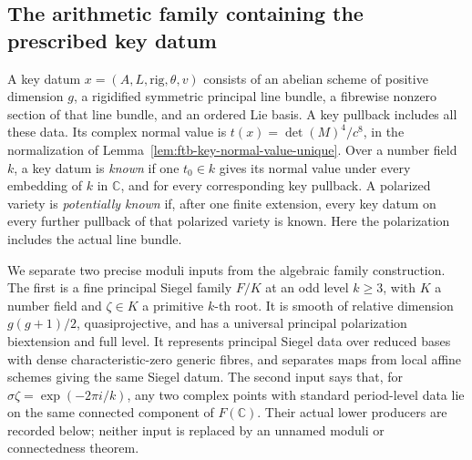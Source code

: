 \subsection{The arithmetic family containing the prescribed key datum}
\label{subsec:ftb-arithmetic-key-family}

A key datum \(x=(A,L,\mathrm{rig},\theta,v)\) consists of an abelian
scheme of positive dimension \(g\), a rigidified symmetric principal
line bundle, a fibrewise nonzero section of that line bundle, and
an ordered Lie basis.  A key pullback includes all these data.
Its complex normal value is \(t(x)=\det(M)^4/c^8\), in the
normalization of Lemma~\ref{lem:ftb-key-normal-value-unique}.
Over a number field \(k\), a key datum is \emph{known} if one
\(t_0\in k\) gives its normal value under every embedding of \(k\)
in \(\mathbb C\), and for every corresponding key pullback.
A polarized variety is \emph{potentially known} if, after one
finite extension, every key datum on every further pullback of
that polarized variety is known.
Here the polarization includes the actual line bundle.

We separate two precise moduli inputs from the algebraic family
construction.  The first is a fine principal Siegel family \(F/K\)
at an odd level \(k\ge3\), with \(K\) a number field and
\(\zeta\in K\) a primitive \(k\)-th root.
It is smooth of relative dimension \(g(g+1)/2\), quasiprojective,
and has a universal principal polarization biextension and full
level.  It represents principal Siegel data over reduced bases
with dense characteristic-zero generic fibres, and separates
maps from local affine schemes giving the same Siegel datum.
The second input says that, for
\(\sigma\zeta=\exp(-2\pi i/k)\), any two complex points with
standard period-level data lie on the same connected component
of \(F(\mathbb C)\).
Their actual lower producers are recorded below; neither input
is replaced by an unnamed moduli or connectedness theorem.


